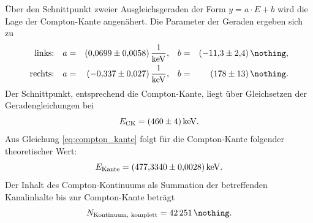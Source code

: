 Über den Schnittpunkt zweier Ausgleichsgeraden der Form $y = a \cdot E + b$ wird die Lage der Compton-Kante angenähert.
Die Parameter der Geraden ergeben sich zu
\begin{align*}
	\text{links:}  && a & = & \SI{0.0699 (58)}{\frac{1}{\kilo \electronvolt}}, && b & = & \SI{-11.3 (24)}{\nothing}, \\
	\text{rechts:} && a & = & \SI{-0.337 (27)}{\frac{1}{\kilo \electronvolt}}, && b & = & \SI{ 178 (13)}{\nothing}. \\
\end{align*}
Der Schnittpunkt, entsprechend die Compton-Kante, liegt über Gleichsetzen der Geradengleichungen bei
\begin{equation*}
	E_{\text{CK}} = \SI{460 (4)}{\kilo \electronvolt}.
\end{equation*}
Aus Gleichung \eqref{eq:compton_kante} folgt für die Compton-Kante folgender theoretischer Wert:
\begin{equation*}
	E_{\text{Kante}} = \SI{477.3340 (28)}{\kilo \electronvolt}.
\end{equation*}
Der Inhalt des Compton-Kontinuums als Summation der betreffenden Kanalinhalte bis zur Compton-Kante beträgt
\begin{equation*}
	N_{\text{Kontinuum, komplett}} = \SI{42251}{\nothing}. %
\end{equation*}


